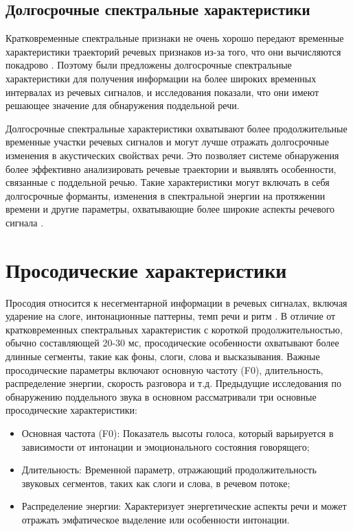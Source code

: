 \subsection{Долгосрочные спектральные характеристики}

Кратковременные спектральные признаки не очень хорошо передают временные характеристики траекторий речевых признаков из-за того, что они вычисляются покадрово \cite{wu2013synthetic}. Поэтому были предложены долгосрочные спектральные характеристики для получения информации на более широких временных интервалах из речевых сигналов, и исследования показали, что они имеют решающее значение для обнаружения поддельной речи.

Долгосрочные спектральные характеристики охватывают более продолжительные временные участки речевых сигналов и могут лучше отражать долгосрочные изменения в акустических свойствах речи. Это позволяет системе обнаружения более эффективно анализировать речевые траектории и выявлять особенности, связанные с поддельной речью. Такие характеристики могут включать в себя долгосрочные форманты, изменения в спектральной энергии на протяжении времени и другие параметры, охватывающие более широкие аспекты речевого сигнала \cite{das2019long}.

\section{Просодические характеристики}

Просодия относится к несегментарной информации в речевых сигналах, включая ударение на слоге, интонационные паттерны, темп речи и ритм \cite{kinnunen2010overview}. В отличие от кратковременных спектральных характеристик с короткой продолжительностью, обычно составляющей 20-30 мс, просодические особенности охватывают более длинные сегменты, такие как фоны, слоги, слова и высказывания. Важные просодические параметры включают основную частоту (F0), длительность, распределение энергии, скорость разговора и т.д. Предыдущие исследования \cite{kinnunen2010overview} по обнаружению поддельного звука в основном рассматривали три основные просодические характеристики:

\begin{itemize}
    \item Основная частота (F0): Показатель высоты голоса, который варьируется в зависимости от интонации и эмоционального состояния говорящего;
    \item Длительность: Временной параметр, отражающий продолжительность звуковых сегментов, таких как слоги и слова, в речевом потоке;
    \item Распределение энергии: Характеризует энергетические аспекты речи и может отражать эмфатическое выделение или особенности интонации.
\end{itemize}


